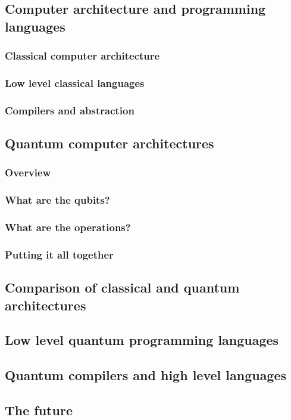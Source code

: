\subsection{Computer architecture and programming languages}
\subsubsection{Classical computer architecture}
\subsubsection{Low level classical languages}
\subsubsection{Compilers and abstraction}
\subsection{Quantum computer architectures}
\subsubsection{Overview}
\subsubsection{What are the qubits?}
\subsubsection{What are the operations?}
\subsubsection{Putting it all together}
\subsection{Comparison of classical and quantum architectures}
\subsection{Low level quantum programming languages}
\subsection{Quantum compilers and high level languages}
\subsection{The future}